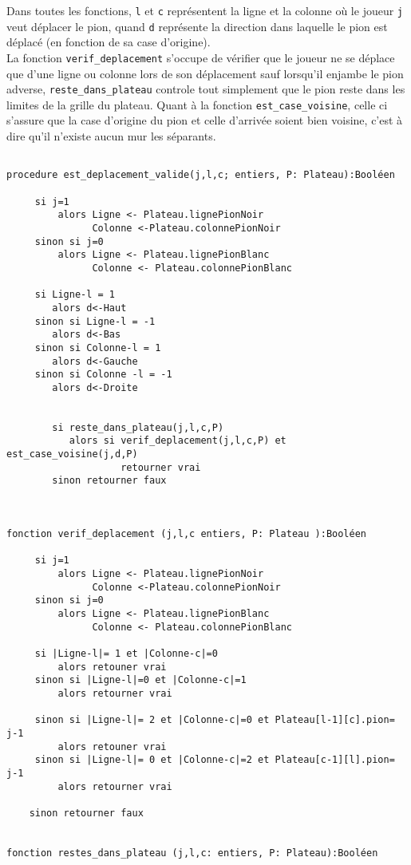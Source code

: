 \documentclass[a4paper, draft]{article}
\begin{document}
Dans toutes les fonctions, \verb?l? et \verb?c? représentent la ligne et la colonne où le joueur \verb?j?  veut déplacer le pion, quand \verb?d? représente la direction dans laquelle
le pion est déplacé (en fonction de sa case d'origine).\\
La fonction \verb?verif_deplacement? s'occupe de vérifier que le joueur ne se déplace que d'une ligne ou colonne lors de son déplacement sauf lorsqu'il enjambe le pion adverse,
\verb?reste_dans_plateau? controle tout simplement que le pion reste dans les limites de la grille du plateau. Quant à la fonction \verb?est_case_voisine?, celle ci s'assure que 
la case d'origine du pion et celle d'arrivée soient bien voisine, c'est à dire qu'il n'existe aucun mur les séparants.
\begin{verbatim}

procedure est_deplacement_valide(j,l,c; entiers, P: Plateau):Booléen

     si j=1
         alors Ligne <- Plateau.lignePionNoir
               Colonne <-Plateau.colonnePionNoir
     sinon si j=0
         alors Ligne <- Plateau.lignePionBlanc
               Colonne <- Plateau.colonnePionBlanc

     si Ligne-l = 1
        alors d<-Haut
     sinon si Ligne-l = -1
        alors d<-Bas
     sinon si Colonne-l = 1
        alors d<-Gauche
     sinon si Colonne -l = -1
        alors d<-Droite


        si reste_dans_plateau(j,l,c,P)
           alors si verif_deplacement(j,l,c,P) et est_case_voisine(j,d,P)
                    retourner vrai
        sinon retourner faux



fonction verif_deplacement (j,l,c entiers, P: Plateau ):Booléen

     si j=1
         alors Ligne <- Plateau.lignePionNoir
               Colonne <-Plateau.colonnePionNoir
     sinon si j=0
         alors Ligne <- Plateau.lignePionBlanc
               Colonne <- Plateau.colonnePionBlanc

     si |Ligne-l|= 1 et |Colonne-c|=0
         alors retouner vrai
     sinon si |Ligne-l|=0 et |Colonne-c|=1
         alors retourner vrai

     sinon si |Ligne-l|= 2 et |Colonne-c|=0 et Plateau[l-1][c].pion= j-1
         alors retouner vrai
     sinon si |Ligne-l|= 0 et |Colonne-c|=2 et Plateau[c-1][l].pion= j-1
         alors retourner vrai

    sinon retourner faux
  

fonction restes_dans_plateau (j,l,c: entiers, P: Plateau):Booléen
      

\end{verbatim}
\end{document}
